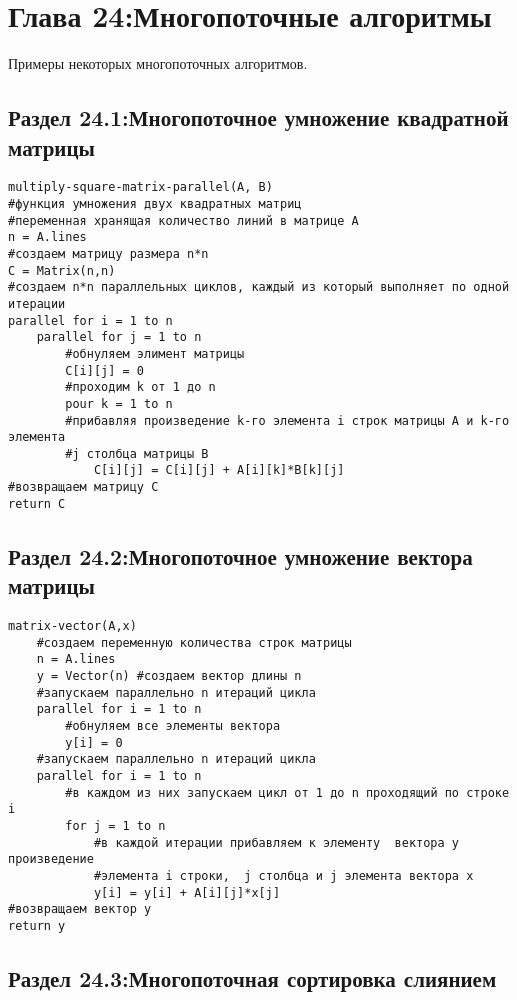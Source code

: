 \chapter*{Глава 24:Многопоточные алгоритмы}

Примеры некоторых многопоточных алгоритмов.

\section*{Раздел 24.1:Многопоточное умножение квадратной матрицы}

\begin{tcolorbox}
\begin{verbatim}
multiply-square-matrix-parallel(A, B) 
#функция умножения двух квадратных матриц
#переменная хранящая количество линий в матрице А
n = A.lines
#создаем матрицу размера n*n
C = Matrix(n,n) 
#создаем n*n параллельных циклов, каждый из который выполняет по одной итерации
parallel for i = 1 to n
	parallel for j = 1 to n
		#обнуляем элимент матрицы
		C[i][j] = 0
		#проходим k от 1 до n
		pour k = 1 to n
		#прибавляя произведение k-го элемента i строк матрицы A и k-го элемента 
		#j столбца матрицы B
			C[i][j] = C[i][j] + A[i][k]*B[k][j]
#возвращаем матрицу С
return C
\end{verbatim}
\end{tcolorbox}

\section*{Раздел 24.2:Многопоточное умножение вектора матрицы}

\begin{tcolorbox}
\begin{verbatim}
matrix-vector(A,x)
	#создаем переменную количества строк матрицы
	n = A.lines
	y = Vector(n) #создаем вектор длины n
	#запускаем параллельно n итераций цикла
	parallel for i = 1 to n
		#обнуляем все элементы вектора
		y[i] = 0
	#запускаем параллельно n итераций цикла
	parallel for i = 1 to n
		#в каждом из них запускаем цикл от 1 до n проходящий по строке i
		for j = 1 to n
			#в каждой итерации прибавляем к элементу  вектора y произведение 
			#элемента i строки,  j столбца и j элемента вектора x
			y[i] = y[i] + A[i][j]*x[j]
#возвращаем вектор y
return y
\end{verbatim}
\end{tcolorbox}

\section*{Раздел 24.3:Многопоточная сортировка слиянием}

